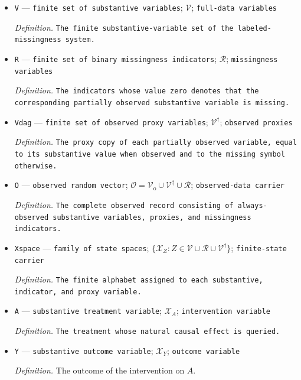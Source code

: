 \documentclass{article}
\begin{document}
\begin{itemize}
  \item \texttt{V} --- \texttt{finite set of substantive variables}; \(\mathcal V\); \texttt{full-\allowbreak{}data variables}
  \par\smallskip\noindent\emph{Definition.} \texttt{The finite substantive-\allowbreak{}variable set of the labeled-\allowbreak{}missingness system.}
  \item \texttt{R} --- \texttt{finite set of binary missingness indicators}; \(\mathcal R\); \texttt{missingness variables}
  \par\smallskip\noindent\emph{Definition.} \texttt{The indicators whose value zero denotes that the corresponding partially observed substantive variable is missing.}
  \item \texttt{Vdag} --- \texttt{finite set of observed proxy variables}; \(\mathcal V^{\dagger}\); \texttt{observed proxies}
  \par\smallskip\noindent\emph{Definition.} \texttt{The proxy copy of each partially observed variable,\allowbreak{} equal to its substantive value when observed and to the missing symbol otherwise.}
  \item \texttt{O} --- \texttt{observed random vector}; \(\mathcal O=\mathcal V_{\mathrm o}\cup\mathcal V^{\dagger}\cup\mathcal R\); \texttt{observed-\allowbreak{}data carrier}
  \par\smallskip\noindent\emph{Definition.} \texttt{The complete observed record consisting of always-\allowbreak{}observed substantive variables,\allowbreak{} proxies,\allowbreak{} and missingness indicators.}
  \item \texttt{Xspace} --- \texttt{family of state spaces}; \(\{\mathcal X_Z:Z\in\mathcal V\cup\mathcal R\cup\mathcal V^{\dagger}\}\); \texttt{finite-\allowbreak{}state carrier}
  \par\smallskip\noindent\emph{Definition.} \texttt{The finite alphabet assigned to each substantive,\allowbreak{} indicator,\allowbreak{} and proxy variable.}
  \item \texttt{A} --- \texttt{substantive treatment variable}; \(\mathcal X_A\); \texttt{intervention variable}
  \par\smallskip\noindent\emph{Definition.} \texttt{The treatment whose natural causal effect is queried.}
  \item \texttt{Y} --- \texttt{substantive outcome variable}; \(\mathcal X_Y\); \texttt{outcome variable}
  \par\smallskip\noindent\emph{Definition.} The outcome of the intervention on \(A\).

\end{itemize}
\end{document}
